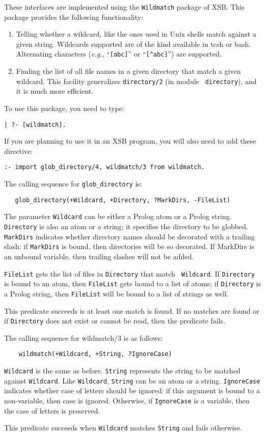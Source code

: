 These interfaces are implemented using the {\tt Wildmatch} package of XSB.
This package provides the following functionality: 
\begin{enumerate}
\item Telling whether a wildcard, like the ones used in Unix shells match
  against a given string. Wildcards supported are of the kind available in
  tcsh or bash. Alternating characters ({\it e.g.}, ``\verb|[abc]|'' or
  ``\verb|[^abc]|'') are supported.
\item Finding the list of all file names in a given directory that match a
  given wildcard. This facility generalizes {\tt directory/2} (in module {\tt
    directory}), and it is much more efficient.
\end{enumerate}

To use this package, you need to type:
\begin{verbatim}
| ?- [wildmatch].  
\end{verbatim}
If you are planning to use it in an XSB program, you will also need to add
these directive:
\begin{verbatim}
:- import glob_directory/4, wildmatch/3 from wildmatch.
\end{verbatim}

The calling sequence for \verb|glob_directory| is:
\begin{verbatim}
   glob_directory(+Wildcard, +Directory, ?MarkDirs, -FileList)  
\end{verbatim}
The parameter {\tt Wildcard} can be either a Prolog atom or a Prolog
string. {\tt Directory} is also an atom or a string; it specifies the
directory to be globbed. {\tt MarkDirs} indicates whether directory names
should be decorated with a trailing slash: if {\tt MarkDirs} is bound, then
directories will be so decorated. If MarkDirs is an unbound variable, then
trailing slashes will not be added.

{\tt FileList} gets the list of files in {\tt Directory} that match {\tt
  Wildcard}.  If {\tt Directory} is bound to an atom, then {\tt FileList}
gets bound to a list of atoms; if {\tt Directory} is a Prolog string, then
{\tt FileList} will be bound to a list of strings as well.

This predicate succeeds is at least one match is found. If no matches are
found or if {\tt Directory} does not exist or cannot be read, then the
predicate fails.

The calling sequence for wildmatch/3 is as follows:
\begin{verbatim}
    wildmatch(+Wildcard, +String, ?IgnoreCase)  
\end{verbatim}
{\tt Wildcard} is the same as before. {\tt String} represents the string to
be matched against {\tt Wildcard}. Like {\tt Wildcard}, {\tt String} can be
an atom or a string. {\tt IgnoreCase} indicates whether case of letters
should be ignored: if this argument is bound to a non-variable, then case
is ignored. Otherwise, if {\tt IgnoreCase} is a variable, then the case of
letters is preserved.

This predicate succeeds when {\tt Wildcard} matches {\tt String} and fails
otherwise.




